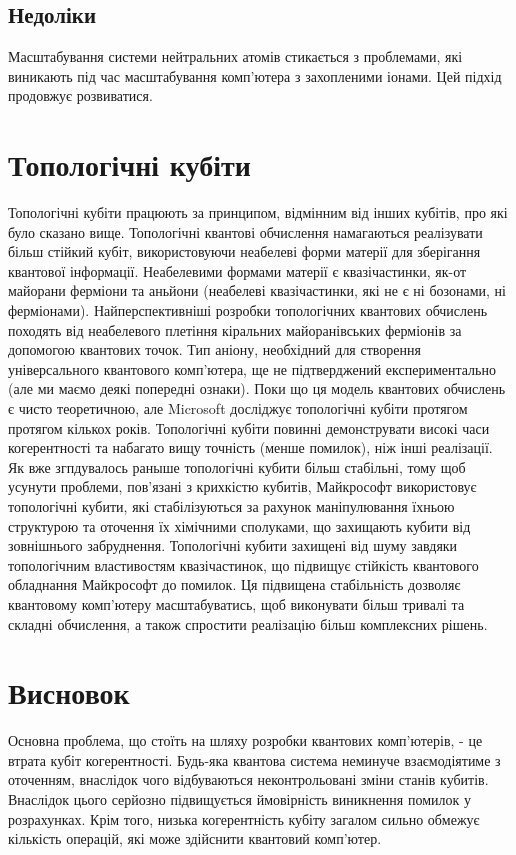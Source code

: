 \documentclass[a4paper,14pt]{extreport}
\begin{document}
\section{Недоліки}
Масштабування системи нейтральних атомів стикається з проблемами, які виникають під час масштабування комп’ютера з захопленими іонами. Цей підхід продовжує розвиватися.
\chapter{Топологічні кубіти}\par 

 Топологічні кубіти працюють за принципом, відмінним від інших кубітів, про які було сказано вище. Топологічні квантові обчислення намагаються реалізувати більш стійкий кубіт, використовуючи неабелеві форми матерії для зберігання квантової інформації. Неабелевими формами матерії є квазічастинки, як-от майорани ферміони та аньйони (неабелеві квазічастинки, які не є ні бозонами, ні ферміонами). Найперспективніші розробки топологічних квантових обчислень походять від неабелевого плетіння кіральних майоранівських ферміонів за допомогою квантових точок. Тип аніону, необхідний для створення універсального квантового комп’ютера, ще не підтверджений експериментально (але ми маємо деякі попередні ознаки). Поки що ця модель квантових обчислень є чисто теоретичною, але Microsoft досліджує топологічні кубіти протягом протягом кількох років. Топологічні кубіти повинні демонструвати високі часи когерентності та набагато вищу точність (менше помилок), ніж інші реалізації.\\ 

 Як вже згпдувалось раныше топологічні кубити більш стабільні, тому щоб усунути проблеми, пов'язані з крихкістю кубитів, Майкрософт використовує топологічні кубити, які стабілізуються за рахунок маніпулювання їхньою структурою та оточення їх хімічними сполуками, що захищають кубити від зовнішнього забруднення. Топологічні кубити захищені від шуму завдяки топологічним властивостям квазічастинок, що підвищує стійкість квантового обладнання Майкрософт до помилок. Ця підвищена стабільність дозволяє квантовому комп'ютеру масштабуватись, щоб виконувати більш тривалі та складні обчислення, а також спростити реалізацію більш комплексних рішень.
\chapter{Висновок}
Основна проблема, що стоїть на шляху розробки квантових комп'ютерів, - це втрата кубіт когерентності. Будь-яка квантова система неминуче взаємодіятиме з оточенням, внаслідок чого відбуваються неконтрольовані зміни станів кубитів. Внаслідок цього серйозно підвищується ймовірність виникнення помилок у розрахунках. Крім того, низька когерентність кубіту загалом сильно обмежує кількість операцій, які може здійснити квантовий комп'ютер.\\
\end{document}
